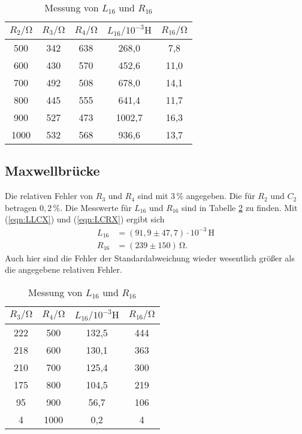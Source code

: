 \begin{table}
  \centering
  \caption{Messung von $L_{16}$ und $R_{16}$}
  \label{tab:Cx,Rx}
  \begin{tabular}{c c c c c}
    \toprule
    $R_2/\unit{\ohm}$ & $R_3/\unit{\ohm}$ & $R_4/\unit{\ohm}$ & $L_{16}/10^{-3}\unit{\henry}$ & $R_{16}/\unit{\ohm}$ \\
    \midrule
     500 & 342 & 638 &  268,0 &  7,8 \\
     600 & 430 & 570 &  452,6 & 11,0 \\
     700 & 492 & 508 &  678,0 & 14,1 \\
     800 & 445 & 555 &  641,4 & 11,7 \\
     900 & 527 & 473 & 1002,7 & 16,3 \\
    1000 & 532 & 568 &  936,6 & 13,7 \\
    \bottomrule
  \end{tabular}
\end{table}

\subsection{Maxwellbrücke}
Die relativen Fehler von $R_3$ und $R_4$ sind mit $3\,\% $ angegeben. Die für $R_2$ und $C_2$ betragen $0,2\,\%$.
Die Messwerte für $L_{16}$ und $R_{16}$ sind in Tabelle \ref{tab:Cx,Rx,Maxwell} zu finden. Mit (\ref{eqn:LLCX}) und (\ref{eqn:LCRX}) ergibt sich
\begin{align*}
  L_{16} &= (91,9 \pm 47,7)\cdot 10^{-3} \,\unit{\henry} \\
  R_{16} &= (239 \pm 150)\,\unit{\ohm}.
\end{align*}
Auch hier sind die Fehler der Standardabweichung wieder wesentlich größer als die angegebene relativen Fehler.

\begin{table}
  \centering
  \caption{Messung von $L_{16}$ und $R_{16}$}
  \label{tab:Cx,Rx,Maxwell}
  \begin{tabular}{c c c c}
    \toprule
    $R_3/\unit{\ohm}$ & $R_4/\unit{\ohm}$ & $L_{16}/10^{-3}\unit{\henry}$ & $R_{16}/\unit{\ohm}$ \\
    \midrule
    222 &  500 &  132,5 & 444 \\
    218 &  600 &  130,1 & 363 \\
    210 &  700 &  125,4 & 300 \\
    175 &  800 &  104,5 & 219 \\
     95 &  900 &   56,7 & 106 \\
      4 & 1000 &    0,2 &   4 \\
    \bottomrule
  \end{tabular}
\end{table}


